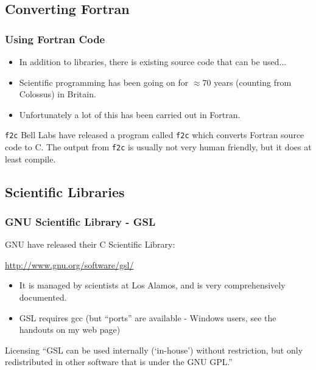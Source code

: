 \documentclass[smaller,handout,table]{beamer}
\begin{document}
\subsection{Converting Fortran}
\begin{frame}
\frametitle{Using Fortran Code}
\begin{itemize}
\item In addition to libraries, there is existing source code that can be used...
\item Scientific programming has been going on for $\approx 70$ years (counting from Colossus) in Britain.
\item Unfortunately a lot of this has been carried out in Fortran.
\end{itemize}
\begin{block}{\tt f2c}
Bell Labs have released a program called {\tt f2c} which converts Fortran source code to C. The output from {\tt f2c} is usually not very human friendly, but it does at least compile.
\end{block}
\end{frame}

\subsection{Scientific Libraries}
\begin{frame}
\frametitle{GNU Scientific Library - GSL}
GNU have released their C Scientific Library:
\begin{center}
\url{http://www.gnu.org/software/gsl/}
\end{center}

\begin{itemize}
\item It is managed by scientists at Los Alamos, and is very comprehensively documented.
\item GSL requires gcc (but ``ports'' are available - Windows users, see the handouts on my web page)
\end{itemize}

\begin{alertblock}{Licensing}
``GSL can be used internally (`in-house') without restriction, but only redistributed in other software that is under the GNU GPL.''
\end{alertblock}
\end{frame}
\end{document}
